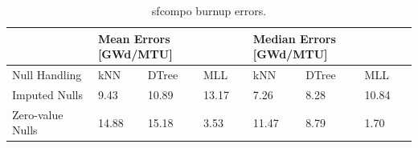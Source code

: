\begin{table}[!ht]
  \centering
  \begin{tabular}{@{}l|lll|lll@{}}
    \toprule
                     & \multicolumn{3}{l|}{Mean Errors [GWd/MTU]} & \multicolumn{3}{l}{Median Errors [GWd/MTU]} \\ \toprule
    Null Handling    & kNN           & DTree         & MLL           & kNN            & DTree          & MLL    \\ \midrule
    Imputed Nulls    & 9.43          & 10.89         & 13.17         & 7.26           & 8.28           & 10.84  \\
    Zero-value Nulls & 14.88         & 15.18         & 3.53          & 11.47          & 8.79           & 1.70   \\ \bottomrule
  \end{tabular}
  \caption{sfcompo burnup errors.}
  \label{tbl:sfcoburn}
\end{table}

